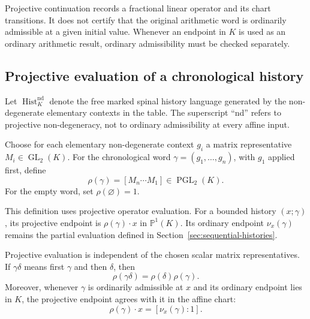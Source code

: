 \begin{warning}
\label{warn:projective-not-ordinary}
Projective continuation records a fractional linear operator and its chart
transitions.  It does not certify that the original arithmetic word is
ordinarily admissible at a given initial value.  Whenever an endpoint in $K$
is used as an ordinary arithmetic result, ordinary admissibility must be
checked separately.
\end{warning}

\subsection{Projective evaluation of a chronological history}

Let $\operatorname{Hist}^{\mathrm{nd}}_K$ denote the free marked spinal
history language generated by the non-degenerate elementary contexts in the
table.  The superscript ``nd'' refers to projective non-degeneracy, not to
ordinary admissibility at every affine input.

\begin{definition}
\label{def:projective-evaluation}
Choose for each elementary non-degenerate context $g_i$ a matrix representative
$M_i\in\operatorname{GL}_2(K)$.  For the chronological word
$\gamma=(g_1,\ldots,g_n)$, with $g_1$ applied first, define
\begin{equation}
  \rho(\gamma)=[M_n\cdots M_1]
  \in\operatorname{PGL}_2(K).
  \label{eq:projective-evaluation-product}
\end{equation}
For the empty word, set $\rho(\varnothing)=1$.
\end{definition}

This definition uses projective operator evaluation.  For a bounded history
$(x;\gamma)$, its projective endpoint is $\rho(\gamma)\cdot x$ in
$\mathbb P^1(K)$.  Its ordinary endpoint $\nu_x(\gamma)$ remains the partial
evaluation defined in Section~\ref{sec:sequential-histories}.

\begin{proposition}
\label{prop:projective-evaluation-chronology}
Projective evaluation is independent of the chosen scalar matrix
representatives.  If $\gamma\delta$ means first $\gamma$ and then $\delta$,
then
\begin{equation}
  \rho(\gamma\delta)=\rho(\delta)\rho(\gamma).
  \label{eq:rho-chronological-antihomomorphism}
\end{equation}
Moreover, whenever $\gamma$ is ordinarily admissible at $x$ and its ordinary
endpoint lies in $K$, the projective endpoint agrees with it in the affine
chart:
\[
  \rho(\gamma)\cdot x=[\nu_x(\gamma):1].
\]
\end{proposition}

